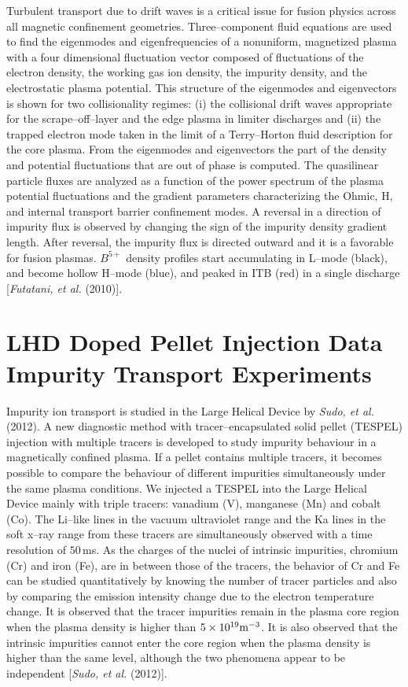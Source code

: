 \documentclass[a4paper,openany,12pt]{book}
\begin{document}
Turbulent transport due to drift waves is a critical issue for fusion physics across all magnetic confinement geometries. Three--component fluid equations are used to find the eigenmodes and eigenfrequencies of a nonuniform, magnetized plasma with a four dimensional fluctuation vector composed of fluctuations of the electron density, the working gas ion density, the impurity density, and the electrostatic plasma potential. This structure of the eigenmodes and eigenvectors is shown for two collisionality regimes: (i) the collisional drift waves appropriate for the scrape--off--layer and the edge plasma in limiter discharges and (ii) the trapped electron mode taken in the limit of a Terry--Horton fluid description for the core plasma. From the eigenmodes and eigenvectors the part of the density and potential fluctuations that are out of phase is computed. The quasilinear particle fluxes are analyzed as a function of the power spectrum of the plasma potential fluctuations and the gradient parameters characterizing the Ohmic, H, and internal transport barrier confinement modes. A reversal in a direction of impurity flux is observed by changing the sign of the impurity density gradient length. After reversal, the impurity flux is directed outward and it is a favorable for fusion plasmas. $B^{5+}$ density profiles start accumulating in L--mode (black), and become hollow H--mode (blue), and peaked in ITB (red) in a single discharge [\emph{Futatani, et al.} (2010)]. 

\section[LHD Doped Pellet Injection Data]{LHD Doped Pellet Injection Data Impurity Transport Experiments}

Impurity ion transport is studied in the Large Helical Device by \emph{Sudo, et al.} (2012).
A new diagnostic method with tracer--encapsulated solid pellet (TESPEL) injection with multiple tracers is developed to study impurity behaviour in a magnetically confined plasma. If a pellet contains multiple tracers, it becomes possible to compare the behaviour of different impurities simultaneously under the same plasma conditions. We injected a TESPEL into the Large Helical Device mainly with triple tracers: vanadium (V), manganese (Mn) and cobalt (Co). The Li--like lines in the vacuum ultraviolet range and the Ka lines in the soft x--ray range from these tracers are simultaneously observed with a time resolution of $50\,$ms. As the charges of the nuclei of intrinsic impurities, chromium (Cr) and iron (Fe), are in between those of the tracers, the behavior of Cr and Fe can be studied quantitatively by knowing the number of tracer particles and also by comparing the emission intensity change due to the electron temperature change. It is observed that the tracer impurities remain in the plasma core region when the plasma density is higher than $5\times 10^{19}\rm m^{-3}$. It is also observed that the intrinsic impurities cannot enter the core region when the plasma density is higher than the same level, although the two phenomena appear to be independent [\emph{Sudo, et al.} (2012)].
\end{document}
